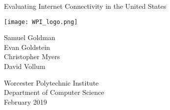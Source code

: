 \noindent\begin{minipage}{0.1\textwidth}
\end{minipage}
\begin{minipage}{0.9\textwidth}
    \begin{center}
        \Huge\noindent Evaluating Internet Connectivity in the United States
        \vspace{0.75in}
        
    \end{center}
    \vspace{1in}
    \begin{minipage}{\textwidth}    
        \begin{flushright}
            \texttt{[image: WPI\_logo.png]} 
        \end{flushright}
    \end{minipage}
    \noindent\begin{minipage}{0.5\textwidth}
        \small
        Samuel Goldman \\
        Evan Goldstein \\
        Christopher Myers \\
        David Vollum
    \end{minipage}
    \begin{minipage}{0.5\textwidth}
        \begin{flushright}
            \small
            Worcester Polytechnic Institute \\
            Department of Computer Science\\
            February 2019
        \end{flushright}
    \end{minipage}
\end{minipage}